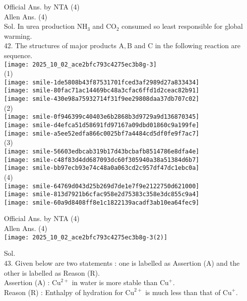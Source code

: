 \documentclass[10pt]{article}
\begin{document}
Official Ans. by NTA (4)\\
Allen Ans. (4)\\
Sol. In urea production \(\mathrm{NH}_{3}\) and \(\mathrm{CO}_{2}\) consumed so least responsible for global warming.\\
42. The structures of major products \(\mathrm{A}, \mathrm{B}\) and C in the following reaction are sequence.\\
\texttt{[image: 2025\_10\_02\_ace2bfc793c4275ec3b8g-3]}\\
(1)\\
\texttt{[image: smile-1de5808b43f87531701fced3af2989d27a833434]}\\
\texttt{[image: smile-80fac71ac14469bc48a3cfac6ffd1d2ceac82b91]}\\
\texttt{[image: smile-430e98a75932714f31f9ee29808daa37db707c02]}\\
(2)\\
\texttt{[image: smile-0f946399c40403e6b2868b3d9729a9d136870345]}\\
\texttt{[image: smile-d4efca51d58691fd97167a09dbd01860c9a199fe]}\\
\texttt{[image: smile-a5ee52edfa866c0025bf7a4484cd5df0fe9f7ac7]}\\
(3)\\
\texttt{[image: smile-56603edbcab319b17d43bcbafb8514786e8dfa4e]}\\
\texttt{[image: smile-c48f83d4dd687093dc60f305940a38a51384d6b7]}\\
\texttt{[image: smile-bb97ecb93e74c48a0a063cd2c957df47dc1ebc0a]}\\
(4)\\
\texttt{[image: smile-64769d043d25b269d7de1e7f9e2122750d621000]}\\
\texttt{[image: smile-813d7921b6cfac958e2d75383c358e3dc855c9a4]}\\
\texttt{[image: smile-60a9d8408ff8e1c1822139acadf3ab10ea64fec9]}

Official Ans. by NTA (4)\\
Allen Ans. (4)\\
\texttt{[image: 2025\_10\_02\_ace2bfc793c4275ec3b8g-3(2)]}

Sol.\\
43. Given below are two statements : one is labelled as Assertion (A) and the other is labelled as Reason (R).\\
Assertion (A) : \(\mathrm{Cu}^{2+}\) in water is more stable than \(\mathrm{Cu}^{+}\).\\
Reason (R) : Enthalpy of hydration for \(\mathrm{Cu}^{2+}\) is much less than that of \(\mathrm{Cu}^{+}\).
\end{document}
